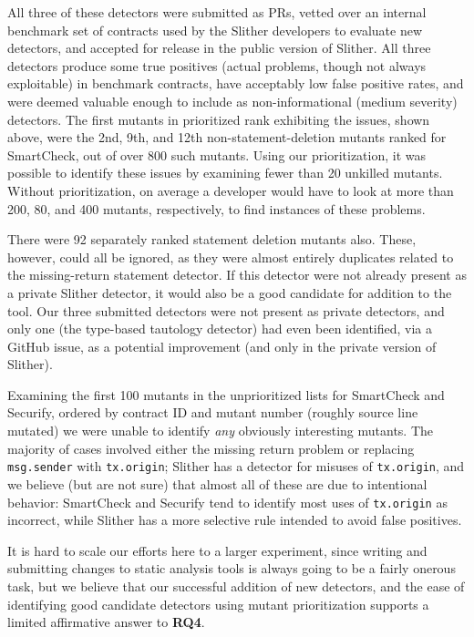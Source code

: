 All three of these detectors were submitted as PRs, vetted over an internal benchmark set of contracts used by the Slither developers to evaluate new detectors, and accepted for release in the public version of Slither.  All three detectors produce some true positives (actual problems, though not always exploitable) in benchmark contracts, have acceptably low false positive rates, and were deemed valuable enough to include as non-informational (medium severity) detectors.  The first mutants in prioritized rank exhibiting the issues, shown above, were the 2nd, 9th, and 12th non-statement-deletion mutants ranked for SmartCheck, out of over 800 such mutants.  Using our prioritization, it was possible to identify these issues by examining fewer than 20 unkilled mutants.  Without prioritization, on average a developer would have to look at more than 200, 80, and 400 mutants, respectively, to find instances of these problems.  

There were 92 separately ranked statement deletion mutants also.  These, however, could all be ignored, as they were almost entirely duplicates related to the missing-return statement detector.  If this detector were not already present as a private Slither detector, it would also be a good candidate for addition to the tool.  Our three submitted detectors were not present as private detectors, and only one (the type-based tautology detector) had even been identified, via a GitHub issue, as a potential improvement (and only in the private version of Slither).  

Examining the first 100 mutants in the unprioritized lists for SmartCheck and Securify, ordered by contract ID and mutant number (roughly source line mutated) we were unable to identify \emph{any} obviously interesting mutants.  The majority of cases involved either the missing return problem or replacing {\tt msg.sender} with {\tt tx.origin}; Slither has a detector for misuses of {\tt tx.origin}, and we believe (but are not sure) that almost all of these are due to intentional behavior: SmartCheck and Securify tend to identify most uses of {\tt tx.origin} as incorrect, while Slither has a more selective rule intended to avoid false positives.

It is hard to scale our efforts here to a larger experiment, since writing and submitting changes to static analysis tools is always going to be a fairly onerous task, but we believe that our successful addition of new detectors, and the ease of identifying good candidate detectors using mutant prioritization supports a limited affirmative answer to {\bf RQ4}.

